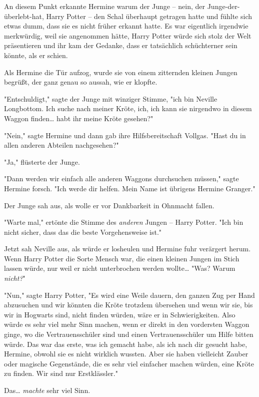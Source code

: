 {An diesem Punkt erkannte Hermine warum der Junge -- nein, der Junge-der-überlebt-hat, Harry Potter -- den Schal überhaupt getragen hatte und fühlte sich etwas dumm, dass sie es nicht früher erkannt hatte. Es war eigentlich irgendwie merkwürdig, weil sie angenommen hätte, Harry Potter würde sich stolz der Welt präsentieren und ihr kam der Gedanke, dass er tatsächlich schüchterner sein könnte, als er schien.

Als Hermine die Tür aufzog, wurde sie von einem zitternden kleinen Jungen begrüßt, der ganz genau so aussah, wie er klopfte.

"Entschuldigt," sagte der Junge mit winziger Stimme, "ich bin Neville Longbottom. Ich suche nach meiner Kröte, ich, ich kann sie nirgendwo in diesem Waggon finden… habt ihr meine Kröte gesehen?"

"Nein," sagte Hermine und dann gab ihre Hilfsbereitschaft Vollgas. "Hast du in allen anderen Abteilen nachgesehen?"

"Ja," flüsterte der Junge.

"Dann werden wir einfach alle anderen Waggons durchsuchen müssen," sagte Hermine forsch. "Ich werde dir helfen. Mein Name ist übrigens Hermine Granger."

Der Junge sah aus, als wolle er vor Dankbarkeit in Ohnmacht fallen.

"Warte mal," ertönte die Stimme des \emph{anderen} Jungen -- Harry Potter. "Ich bin nicht sicher, dass das die beste Vorgehensweise ist."

Jetzt sah Neville aus, als würde er losheulen und Hermine fuhr verärgert herum. Wenn Harry Potter die Sorte Mensch war, die einen kleinen Jungen im Stich lassen würde, nur weil er nicht unterbrochen werden wollte… "Was? Warum \emph{nicht?}"

"Nun," sagte Harry Potter, "Es wird eine Weile dauern, den ganzen Zug per Hand abzusuchen und wir könnten die Kröte trotzdem übersehen und wenn wir sie, bis wir in Hogwarts sind, nicht finden würden, wäre er in Schwierigkeiten. Also würde es sehr viel mehr Sinn machen, wenn er direkt in den vordersten Waggon ginge, wo die Vertrauensschüler sind und einen Vertrauensschüler um Hilfe bitten würde. Das war das erste, was ich gemacht habe, als ich nach dir gesucht habe, Hermine, obwohl sie es nicht wirklich wussten. Aber sie haben vielleicht Zauber oder magische Gegenstände, die es sehr viel einfacher machen würden, eine Kröte zu finden. Wir sind nur Erstklässler."

Das… \emph{machte} sehr viel Sinn.

}
